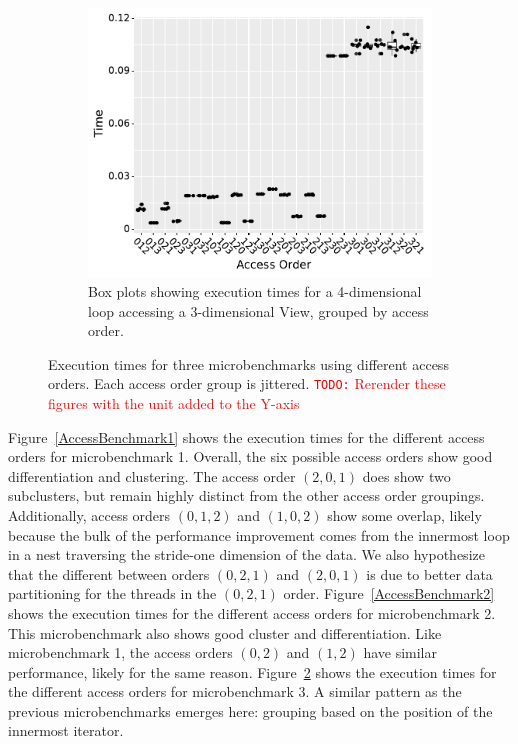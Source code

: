 \documentclass[sigconf,review=true]{acmart}
\newcommand{\todo}[1]{{\textcolor{red}{{\tt{TODO:}}\,\,#1 }}}
\begin{document}
\begin{figure}
\bigskip
\begin{subfigure}{0.48\textwidth}
	\includegraphics[width=\textwidth]{benchmark3_boxplot.pdf}
	\caption{Box plots showing execution times for a 4-dimensional loop accessing a 3-dimensional View, grouped by access order.}
	\label{AccessBenchmark3}
\end{subfigure}

\caption{Execution times for three microbenchmarks using different access orders. Each access order group is jittered. \todo{Rerender these figures with the unit added to the Y-axis}}
\end{figure}

Figure~\ref{AccessBenchmark1} shows the execution times for the different access orders for microbenchmark 1.
Overall, the six possible access orders show good differentiation and clustering.
The access order $(2,0,1)$ does show two subclusters, but remain highly distinct from the other access order groupings. 
Additionally, access orders $(0,1,2)$ and $(1,0,2)$ show some overlap, likely because the bulk of the performance improvement comes from the innermost loop in a nest traversing the stride-one dimension of the data.
We also hypothesize that the different between orders $(0,2,1)$ and $(2,0,1)$ is due to better data partitioning for the threads in the $(0,2,1)$ order. 
Figure~\ref{AccessBenchmark2} shows the execution times for the different access orders for microbenchmark 2. 
This microbenchmark also shows good cluster and differentiation.
Like microbenchmark 1, the access orders $(0,2)$ and $(1,2)$ have similar performance, likely for the same reason. 
Figure~\ref{AccessBenchmark3} shows the execution times for the different access orders for microbenchmark 3.
A similar pattern as the previous microbenchmarks emerges here: grouping based on the position of the innermost iterator. 
\end{document}
